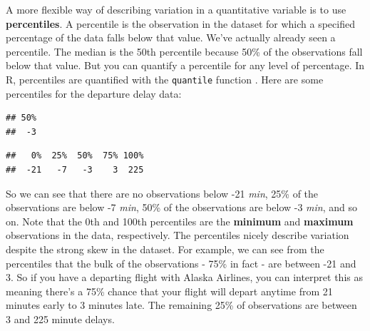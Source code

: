 \documentclass[
]{book}
\newenvironment{Shaded}{\begin{snugshade}}{\end{snugshade}}
\newcommand{\AttributeTok}[1]{\textcolor[rgb]{0.13,0.29,0.53}{#1}}
\newcommand{\ConstantTok}[1]{\textcolor[rgb]{0.56,0.35,0.01}{#1}}
\newcommand{\DecValTok}[1]{\textcolor[rgb]{0.00,0.00,0.81}{#1}}
\newcommand{\DocumentationTok}[1]{\textcolor[rgb]{0.56,0.35,0.01}{\textbf{\textit{#1}}}}
\newcommand{\FloatTok}[1]{\textcolor[rgb]{0.00,0.00,0.81}{#1}}
\newcommand{\FunctionTok}[1]{\textcolor[rgb]{0.13,0.29,0.53}{\textbf{#1}}}
\newcommand{\NormalTok}[1]{#1}
\newcommand{\SpecialCharTok}[1]{\textcolor[rgb]{0.81,0.36,0.00}{\textbf{#1}}}
\begin{document}
A more flexible way of describing variation in a quantitative variable is to use \textbf{percentiles}. A percentile is the observation in the dataset for which a specified percentage of the data falls below that value. We've actually already seen a percentile. The median is the 50th percentile because 50\% of the observations fall below that value. But you can quantify a percentile for any level of percentage. In R, percentiles are quantified with the \texttt{quantile} function . Here are some percentiles for the departure delay data:

\begin{Shaded}
\end{Shaded}

\begin{verbatim}
## 50% 
##  -3
\end{verbatim}

\begin{Shaded}
\end{Shaded}

\begin{verbatim}
##   0%  25%  50%  75% 100% 
##  -21   -7   -3    3  225
\end{verbatim}

So we can see that there are no observations below -21 \emph{min}, 25\% of the observations are below -7 \emph{min}, 50\% of the observations are below -3 \emph{min}, and so on. Note that the 0th and 100th percentiles are the \textbf{minimum} and \textbf{maximum} observations in the data, respectively. The percentiles nicely describe variation despite the strong skew in the dataset. For example, we can see from the percentiles that the bulk of the observations - 75\% in fact - are between -21 and 3. So if you have a departing flight with Alaska Airlines, you can interpret this as meaning there's a 75\% chance that your flight will depart anytime from 21 minutes early to 3 minutes late. The remaining 25\% of observations are between 3 and 225 minute delays.
\end{document}
